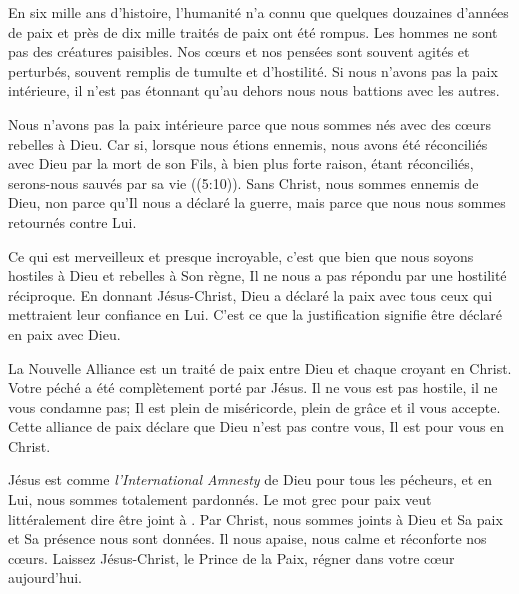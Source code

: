 

En six mille ans d'histoire, l'humanité n'a connu que quelques douzaines d'années de paix et près de dix mille traités de paix ont été rompus. Les hommes ne sont pas des créatures paisibles. Nos cœurs et nos pensées sont souvent agités et perturbés, souvent remplis de tumulte et d'hostilité. Si nous n'avons pas la paix intérieure, il n'est pas étonnant qu'au dehors nous nous battions avec les autres.

Nous n'avons pas la paix intérieure parce que nous sommes nés avec des cœurs rebelles à Dieu.
 \Og Car si, lorsque nous étions ennemis, nous avons été réconciliés avec Dieu par la mort de son Fils, à bien plus forte raison, étant réconciliés, serons-nous sauvés par sa vie \Fg{} ((5:10)). Sans Christ, nous sommes ennemis de Dieu, non parce qu'Il nous a déclaré la guerre, mais parce que nous nous sommes retournés contre Lui.

Ce qui est merveilleux et presque incroyable, c'est que bien que nous soyons hostiles à Dieu et rebelles à Son règne, Il ne nous a pas répondu par une hostilité réciproque. En donnant Jésus-Christ, Dieu a déclaré la paix avec tous ceux qui mettraient leur confiance en Lui. C'est ce que la justification signifie \ocadr être déclaré en paix avec Dieu.

La Nouvelle Alliance est un traité de paix entre Dieu et chaque croyant en Christ. Votre péché a été complètement porté par Jésus. Il ne vous est pas hostile, il ne vous condamne pas; Il est plein de miséricorde, plein de grâce et il vous accepte. Cette alliance de paix déclare que Dieu n'est pas contre vous, Il est pour vous en Christ.

Jésus est comme \emph{l'International Amnesty} de Dieu pour tous les pécheurs, et en Lui, nous sommes totalement pardonnés. Le mot grec pour \Og paix \Fg{} veut littéralement dire \Og être joint à \Fg{}. Par Christ, nous sommes joints à Dieu et Sa paix et Sa présence nous sont données. Il nous apaise, nous calme et réconforte nos cœurs. Laissez Jésus-Christ, le Prince de la Paix, régner dans votre cœur aujourd'hui.


\begin{dvquotes}
\end{dvquotes}

